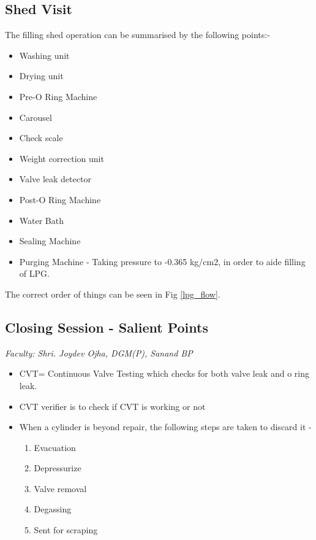 \documentclass{report}
\begin{document}
	\subsection{Shed Visit}
	The filling shed operation can be summarised by the following points:-
	\begin{itemize}
		\item Washing unit
		\item Drying unit
		\item Pre-O Ring Machine
		\item Carousel
		\item Check scale
		\item Weight correction unit
		\item Valve leak detector
		\item Post-O Ring Machine
		\item Water Bath
		\item Sealing Machine
		\item Purging Machine - Taking pressure to -0.365 kg/cm2, in order to aide filling of LPG.
	\end{itemize}
	The correct order of things can be seen in Fig \ref{lpg_flow}.
	\subsection{Closing Session - Salient Points}
	\textit{Faculty: Shri. Joydev Ojha, DGM(P), Sanand BP}\\
	\begin{itemize}
	\item CVT= Continuous Valve Testing which checks for both valve leak and o ring leak.
	\item CVT verifier is to check if CVT is working or not
	\item When a cylinder is beyond repair, the following steps are taken to discard it - 
	\begin{enumerate}
		\item Evacuation
		\item Depressurize
		\item Valve removal
		\item Degassing
		\item Sent for scraping
	\end{enumerate}
	\end{itemize}
\end{document}
